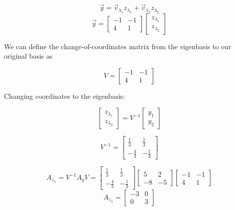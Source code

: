 \begin{enumerate}
{$$\vec y =\vec v_{\lambda_1} z_{\lambda_1} + \vec v_{\lambda_2} z_{\lambda_2}$$
$$\vec y =\begin{bmatrix} -1 & -1 \\ 4 & 1\end{bmatrix}\begin{bmatrix}z_{\lambda_1} \\ z_{\lambda_2}\end{bmatrix}$$

We can define the change-of-coordinates matrix from the eigenbasis to our original basis as 

$$V=\begin{bmatrix} -1 & -1 \\ 4 & 1\end{bmatrix}$$

Changing coordinates to the eigenbasis:

$$\begin{bmatrix}z_{\lambda_1} \\ z_{\lambda_2}\end{bmatrix} = V^{-1}\begin{bmatrix}y_1 \\ y_2\end{bmatrix}   $$

$$V^{-1}=\begin{bmatrix}\frac{1}{3} & \frac{1}{3} \\ -\frac{4}{3} & -\frac{1}{3}\end{bmatrix}$$

$$A_{z_\lambda} = V^{-1} A_y V = \begin{bmatrix}\frac{1}{3} & \frac{1}{3} \\ -\frac{4}{3} & -\frac{1}{3}\end{bmatrix}\begin{bmatrix}5 & 2 \\ -8 & -5\end{bmatrix}\begin{bmatrix} -1 & -1 \\ 4 & 1\end{bmatrix}$$
$$A_{z_\lambda} = \begin{bmatrix}-3 & 0 \\ 0 & 3\end{bmatrix}$$

}
\end{enumerate}
